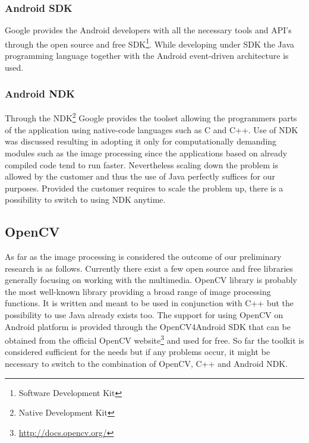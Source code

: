 \subsubsection{Android SDK}

Google provides the Android developers with all the necessary tools and API's through the open source and free SDK\footnote{Software Development Kit}. While developing under SDK the Java programming language together with the Android event-driven architecture is used.

\subsubsection{Android NDK}

Through the NDK\footnote{Native Development Kit} Google provides the toolset allowing the programmers parts of the application using native-code languages such as C and C++.
Use of NDK was discussed resulting in adopting it only for computationally demanding modules such as the image processing since the applications based on already compiled code tend to run faster.
Nevertheless scaling down the problem is allowed by the customer and thus the use of Java perfectly suffices for our purposes.
Provided the customer requires to scale the problem up, there is a possibility to switch to using NDK anytime.


\subsection{OpenCV} \label{subsec:image_processing_library}

As far as the image processing is considered the outcome of our preliminary research is as follows.
Currently there exist a few open source and free libraries generally focusing on working with the multimedia.
OpenCV library is probably the most well-known library providing a broad range of image processing functions.
It is written and meant to be used in conjunction with C++ but the possibility to use Java already exists too.
The support for using OpenCV on Android platform is provided through the OpenCV4Android SDK that can be obtained from the official OpenCV website\footnote{\url{http://docs.opencv.org/}} and used for free.
So far the toolkit is considered sufficient for the needs but if any problems occur, it might be necessary to switch to the combination of OpenCV, C++ and Android NDK.

